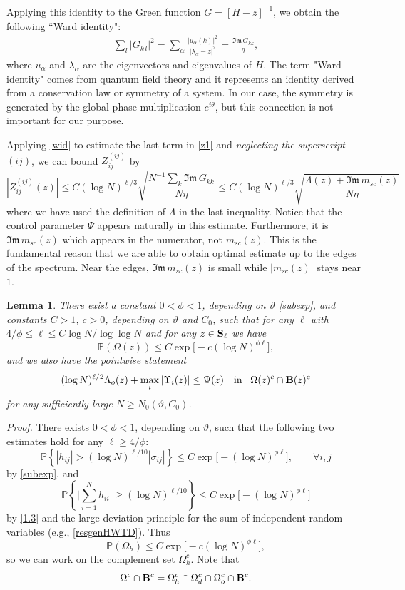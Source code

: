 \documentclass[draft]{article}
\newcommand{\ttau}{\vartheta}
\newcommand{\al}{\alpha}
\newcommand{\be}{\begin{equation}}
\newcommand{\ee}{\end{equation}}
\newcommand{\im}{{\mathfrak{Im} \, }}
\renewcommand{\P}{{\mathbb P}}
\newtheorem{lemma}[theorem]{Lemma}
\numberwithin{equation}{section}
\numberwithin{theorem}{section}
\numberwithin{definition}{section}
\numberwithin{remark}{section}
\begin{document}
Applying this identity   to the Green function $G = [H-z]^{-1}$, we obtain 
the following ``Ward identity": 
\begin{align} \label{wid}
\sum_{l }\left| 
G_{k\,l} \right|^2 = \sum_{\alpha}
\frac{|u_\alpha(k)|^2}{|\lambda_\alpha-z|^2} =   \frac{\im G_{kk}}{\eta},
\end{align}
where $u_\alpha$ and $\lambda_\al$ are 
 the eigenvectors and eigenvalues of $H$.
The term "Ward identity" comes from quantum field theory and it represents an identity 
derived from a conservation law or symmetry of a system. In our case, the symmetry is generated by 
the global phase multiplication  $e^{i \theta}$, but this connection is not important for our purpose.

Applying \eqref{wid} to estimate the last term in \eqref{z1} and {\it neglecting the superscript $(ij)$}, we can 
bound $ Z_{ij}^{(ij)}$ by
$$
|Z_{ij}^{(ij)}(z)|
 \leq  C(\log N)^{\ell/3}    \sqrt{\frac{  N^{-1} \sum_k  \im G_{kk} }{N \eta}  }
 \leq  C(\log N)^{\ell/3}    \sqrt{\frac{ \Lambda(z) +  {\im m_{sc}(z) }}{N \eta}  }
$$
where we have used the definition of $\Lambda$ in the last inequality. Notice that the control parameter 
$\Psi$ appears naturally in this estimate. Furthermore, it is $\im m_{sc}(z)$ which appears in the numerator, not 
$m_{sc}(z)$. This is the fundamental reason that we are able to obtain optimal estimate up to the edges 
of the spectrum. Near the edges, $\im m_{sc}(z)$  is small while $|m_{sc}(z)|$  stays near $1$. 






\begin{lemma}\label{selfeq1} 
 There exist a constant $0<\phi < 1$, depending on 
$\ttau$ \eqref{subexp}, and constants  $C>1$, $c>0$, depending on $\ttau$ and $C_0$,
such that 
 for any $\ell$ with 
$4/\phi \le \ell \le  C \log N/\log \log N $ and for any $z\in {\bf S}_\ell $ 
 we have 
\be\label{B12}
\P (\Omega (z))    \le  C\exp{\big[-c(\log N)^{\phi \ell } \big]},
\ee
and we also have the pointwise statement 
 \be\label{21}
(\log N)^{\ell/2}\Lambda_o(z) + \max_i  |\Upsilon_i(z)|
 \le   \Psi(z)     \quad \text {in}  \;\;\;  \Omega (z)^c \cap  {\bf B}(z)^c
\ee
for any sufficiently large $N\ge N_0(\ttau, C_0)$.
\end{lemma}




\bigskip 


{\it Proof.} There exists $0 <\phi< 1$,  depending on $\ttau$,
such that the following two estimates hold
for any $\ell \ge 4/\phi$: 
$$
   \P \left \{   |h_{ij}|>
(\log N)^{\ell/10} |\sigma_{ij}|  \right \}  \le  C\exp{\big[-(\log N)^{\phi\ell} \big]},
 \qquad\forall i, j
$$
 by \eqref{subexp}, and
$$
  \P \left\{ \Big| \sum_{i=1}^N h_{ii}\Big|\ge (\log N)^{\ell/10}  \right\} 
 \le    C\exp{\big[-(\log N)^{\phi \ell } \big]} 
$$
by \eqref{1.3} and  the large deviation principle for the sum of independent random
variables  (e.g., \eqref{resgenHWTD}).  Thus
\be\label{resboundhij}
\P\left(\Omega_h \right)\leq   C\exp{\big[-c(\log N)^{\phi \ell } \big]},
\ee
so we can work on the complement set $\Omega_h^c$.  Note that  
\be
    \Omega^c \cap  {\bf B}^c = \Omega_h^c \cap \Omega_d^c\cap \Omega_o^c\cap {\bf B}^c.
\label{capp}
\ee
\end{document}
